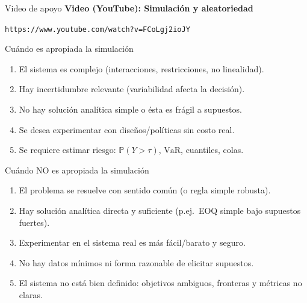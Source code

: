 \documentclass[aspectratio=1610, 9pt]{beamer}
\begin{document}
\begin{frame}{Video de apoyo}
\centering
\Large\textbf{Video (YouTube): Simulación y aleatoriedad}

\vspace{0.5cm}
\href{https://www.youtube.com/watch?v=FCoLgj2ioJY}{}

\vspace{0.8cm}

\vspace{0.4cm}
\footnotesize\texttt{https://www.youtube.com/watch?v=FCoLgj2ioJY}
\end{frame}

\begin{frame}{Cuándo es apropiada la simulación}
\begin{enumerate}
  \item El sistema es complejo (interacciones, restricciones, no linealidad).
  \item Hay incertidumbre relevante (variabilidad afecta la decisión).
  \item No hay solución analítica simple o ésta es frágil a supuestos.
  \item Se desea experimentar con diseños/políticas sin costo real.
  \item Se requiere estimar riesgo: $\mathbb P(Y>\tau)$, $\mathrm{VaR}$, cuantiles, colas.
\end{enumerate}
\end{frame}

\begin{frame}{Cuándo NO es apropiada la simulación}
\begin{enumerate}
  \item El problema se resuelve con sentido común (o regla simple robusta).
  \item Hay solución analítica directa y suficiente (p.ej.\ EOQ simple bajo supuestos fuertes).
  \item Experimentar en el sistema real es más fácil/barato y seguro.
  \item No hay datos mínimos ni forma razonable de elicitar supuestos.
  \item El sistema no está bien definido: objetivos ambiguos, fronteras y métricas no claras.
\end{enumerate}
\end{frame}
\end{document}
